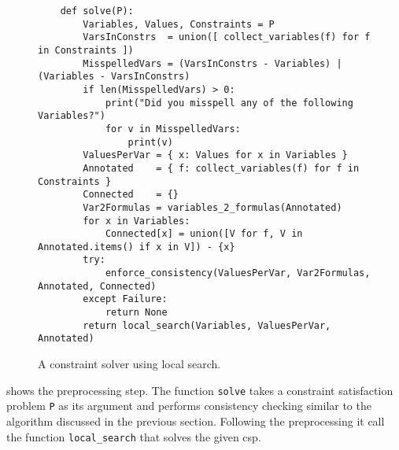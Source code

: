 \begin{figure}[!ht]
\centering
\begin{verbatim}
    def solve(P):
        Variables, Values, Constraints = P
        VarsInConstrs  = union([ collect_variables(f) for f in Constraints ])
        MisspelledVars = (VarsInConstrs - Variables) | (Variables - VarsInConstrs)
        if len(MisspelledVars) > 0:
            print("Did you misspell any of the following Variables?")
            for v in MisspelledVars:
                print(v)
        ValuesPerVar = { x: Values for x in Variables }
        Annotated    = { f: collect_variables(f) for f in Constraints }
        Connected    = {}
        Var2Formulas = variables_2_formulas(Annotated)
        for x in Variables:
            Connected[x] = union([V for f, V in Annotated.items() if x in V]) - {x}
        try:
            enforce_consistency(ValuesPerVar, Var2Formulas, Annotated, Connected)
        except Failure:
            return None
        return local_search(Variables, ValuesPerVar, Annotated)
\end{verbatim}
\vspace*{-0.3cm}
\caption{A constraint solver using local search.}
\label{fig:Local-Search.ipynb:solve}
\end{figure}

 shows the preprocessing step.  The function \texttt{solve} takes a constraint
satisfaction problem \texttt{P} as its argument and performs consistency checking similar to the algorithm
discussed in the previous section.  Following the preprocessing it call the function \texttt{local\_search}
that solves the given \ac{csp}.

